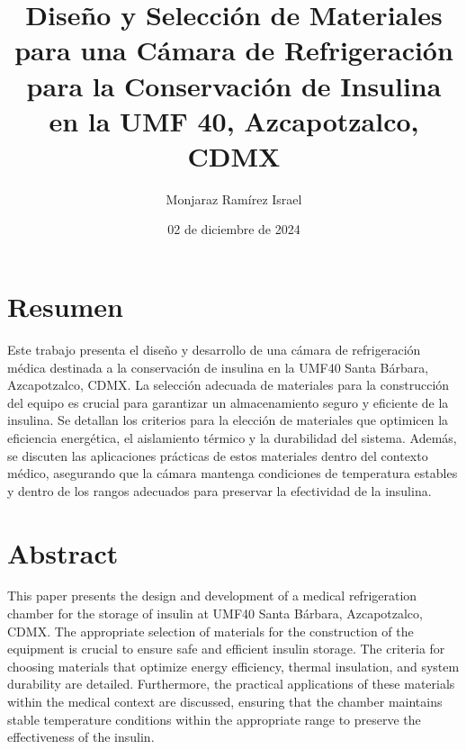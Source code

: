 \documentclass{article}
\title{Diseño y Selección de Materiales para una Cámara de Refrigeración para la Conservación de Insulina en la UMF 40, Azcapotzalco, CDMX}
\author{Monjaraz Ramírez Israel}
\date{02 de diciembre de 2024}
\begin{document}
\maketitle

\justifying

\section*{Resumen}
Este trabajo presenta el diseño y desarrollo de una cámara de refrigeración médica destinada a la conservación de insulina en la UMF40 Santa Bárbara, Azcapotzalco, CDMX. La selección adecuada de materiales para la construcción del equipo es crucial para garantizar un almacenamiento seguro y eficiente de la insulina. Se detallan los criterios para la elección de materiales que optimicen la eficiencia energética, el aislamiento térmico y la durabilidad del sistema. Además, se discuten las aplicaciones prácticas de estos materiales dentro del contexto médico, asegurando que la cámara mantenga condiciones de temperatura estables y dentro de los rangos adecuados para preservar la efectividad de la insulina.

\section*{Abstract}
This paper presents the design and development of a medical refrigeration chamber for the storage of insulin at UMF40 Santa Bárbara, Azcapotzalco, CDMX. The appropriate selection of materials for the construction of the equipment is crucial to ensure safe and efficient insulin storage. The criteria for choosing materials that optimize energy efficiency, thermal insulation, and system durability are detailed. Furthermore, the practical applications of these materials within the medical context are discussed, ensuring that the chamber maintains stable temperature conditions within the appropriate range to preserve the effectiveness of the insulin.
\end{document}
